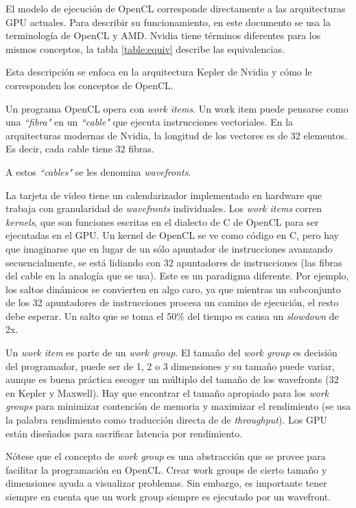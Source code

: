 El modelo de ejecución de OpenCL corresponde directamente a las arquitecturas
GPU actuales. Para describir su funcionamiento, en este documento se usa la
terminología de OpenCL y AMD. Nvidia tiene términos diferentes para los mismos
conceptos, la tabla \ref{table:equiv} describe las equivalencias.

Esta descripción se enfoca en la arquitectura Kepler de Nvidia y cómo le
corresponden los conceptos de OpenCL.

Un programa OpenCL opera con \emph{work items}. Un work item puede pensarse
como una \emph{``fibra"} en un \emph{``cable"} que ejecuta instrucciones
vectoriales. En la arquitecturas modernas de Nvidia, la longitud de los
vectores es de 32 elementos. Es decir, cada cable tiene 32 fibras.

A estos \emph{``cables"} se les denomina \emph{wavefronts}.

La tarjeta de video tiene un calendarizador implementado en hardware que
trabaja con granularidad de \emph{wavefronts} individuales. Los \emph{work
items} corren \emph{kernels}, que son funciones escritas en el
dialecto de C de OpenCL para ser ejecutadas en el GPU. Un kernel de OpenCL se
ve como código en C, pero hay que imaginarse que en lugar de un sólo apuntador
de instrucciones avanzando secuencialmente, se está lidiando con 32 apuntadores
de instrucciones (las fibras del cable en la analogía que se usa). Este es un
paradigma diferente. Por ejemplo, los saltos dinámicos se convierten en algo
caro, ya que mientras un subconjunto de los 32 apuntadores de instrucciones
procesa un camino de ejecución, el resto debe esperar. Un salto que se toma el
50\% del tiempo es causa un \emph{slowdown} de 2x.

Un \emph{work item} es parte de un \emph{work group}. El tamaño del \emph{work
group} es decisión del programador, puede ser de 1, 2 o 3 dimensiones y su
tamaño puede variar, aunque es buena práctica escoger un múltiplo del tamaño de
los wavefronts (32 en Kepler y Maxwell). Hay que encontrar el tamaño apropiado
para los \emph{work groups} para minimizar contención de memoria y maximizar el
rendimiento (se usa la palabra rendimiento como traducción directa de de
\emph{throughput}). Los GPU están diseñados para sacrificar latencia por
rendimiento.

Nótese que el concepto de \emph{work group} es una abstracción que se provee
para facilitar la programación en OpenCL. Crear work groups de cierto tamaño y
dimensiones ayuda a visualizar problemas. Sin embargo, es importante tener
siempre en cuenta que un work group siempre es ejecutado por un wavefront.

